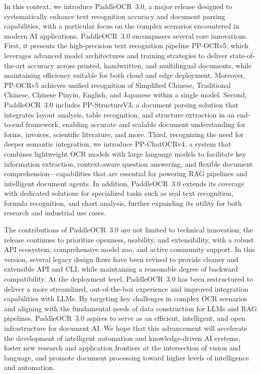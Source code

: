 \documentclass[11pt, a4paper, logo, copyright, nonumbering]{paddleocr}
\begin{document}
In this context, we introduce PaddleOCR~3.0, a major release designed to systematically enhance text recognition accuracy and document parsing capabilities, with a particular focus on the complex scenarios encountered in modern AI applications. PaddleOCR~3.0 encompasses several core innovations. First, it presents the high-precision text recognition pipeline PP-OCRv5, which leverages advanced model architectures and training strategies to deliver state-of-the-art accuracy across printed, handwritten, and multilingual documents, while maintaining efficiency suitable for both cloud and edge deployment. Moreover, PP-OCRv5 achieves unified recognition of Simplified Chinese, Traditional Chinese, Chinese Pinyin, English, and Japanese within a single model. Second, PaddleOCR~3.0 includes PP-StructureV3, a document parsing solution that integrates layout analysis, table recognition, and structure extraction in an end-to-end framework, enabling accurate and scalable document understanding for forms, invoices, scientific literature, and more. Third, recognizing the need for deeper semantic integration, we introduce PP-ChatOCRv4, a system that combines lightweight OCR models with large language models to facilitate key information extraction, context-aware question answering, and flexible document comprehension—capabilities that are essential for powering RAG pipelines and intelligent document agents. In addition, PaddleOCR~3.0 extends its coverage with dedicated solutions for specialized tasks such as seal text recognition, formula recognition, and chart analysis, further expanding its utility for both research and industrial use cases.

The contributions of PaddleOCR~3.0 are not limited to technical innovation; the release continues to prioritize openness, usability, and extensibility, with a robust API ecosystem, comprehensive model zoo, and active community support. In this version, several legacy design flaws have been revised to provide cleaner and extensible API and CLI, while maintaining a reasonable degree of backward compatibility. At the deployment level, PaddleOCR~3.0 has been restructured to deliver a more streamlined, out-of-the-box experience and improved integration capabilities with LLMs. By targeting key challenges in complex OCR scenarios and aligning with the fundamental needs of data construction for LLMs and RAG pipelines, PaddleOCR~3.0 aspires to serve as an efficient, intelligent, and open infrastructure for document AI. We hope that this advancement will accelerate the development of intelligent automation and knowledge-driven AI systems, foster new research and application frontiers at the intersection of vision and language, and promote document processing toward higher levels of intelligence and automation.
\end{document}
